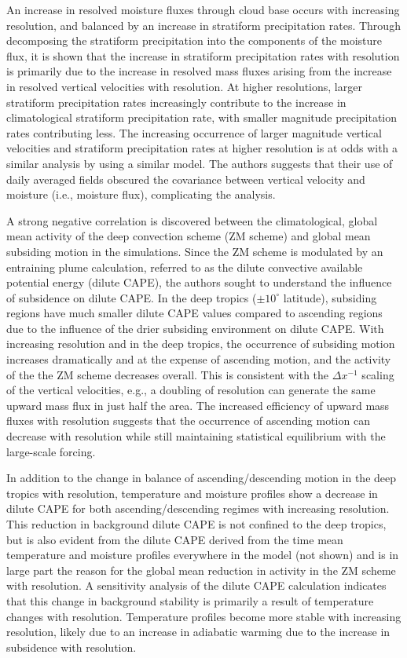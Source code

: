 \documentclass[times]{qjrms4}
\begin{document}
An increase in resolved moisture fluxes through cloud base occurs with increasing resolution, and balanced by an increase in stratiform precipitation rates. Through decomposing the stratiform precipitation into the components of the moisture flux, it is shown that the increase in stratiform precipitation rates with resolution is primarily due to the increase in resolved mass fluxes arising from the increase in resolved vertical velocities with resolution. At higher resolutions, larger stratiform precipitation rates increasingly contribute to the increase in climatological stratiform precipitation rate, with smaller magnitude precipitation rates contributing less. The increasing occurrence of larger magnitude vertical velocities and stratiform precipitation rates at higher resolution is at odds with a similar analysis by \cite{TETAL2018CD} using a similar model. The authors suggests that their use of daily averaged fields obscured the covariance between vertical velocity and moisture (i.e., moisture flux), complicating the analysis.

A strong negative correlation is discovered between the climatological, global mean activity of the \cite{ZM1995AO} deep convection scheme (ZM scheme) and global mean subsiding motion in the simulations. Since the ZM scheme is modulated by an entraining plume calculation, referred to as the dilute convective available potential energy (dilute CAPE), the authors sought to understand the influence of subsidence on dilute CAPE. In the deep tropics ($\pm 10^{\circ}$ latitude), subsiding regions have much smaller dilute CAPE values compared to ascending regions due to the influence of the drier subsiding environment on dilute CAPE. With increasing resolution and in the deep tropics, the occurrence of subsiding motion increases dramatically and at the expense of ascending motion, and the activity of the the ZM scheme decreases overall. This is consistent with the $\Delta x^{-1}$ scaling of the vertical velocities, e.g., a doubling of resolution can generate the same upward mass flux in just half the area. The increased efficiency of upward mass fluxes with resolution suggests that the occurrence of ascending motion can decrease with resolution while still maintaining statistical equilibrium with the large-scale forcing.

In addition to the change in balance of ascending/descending motion in the deep tropics with resolution, temperature and moisture profiles show a decrease in dilute CAPE for both ascending/descending regimes with increasing resolution. This reduction in background dilute CAPE is not confined to the deep tropics, but is also evident from the dilute CAPE derived from the time mean temperature and moisture profiles everywhere in the model (not shown) and is in large part the reason for the global mean reduction in activity in the ZM scheme with resolution. A sensitivity analysis of the dilute CAPE calculation indicates that this change in background stability is primarily a result of temperature changes with resolution. Temperature profiles become more stable with increasing resolution, likely due to an increase in adiabatic warming due to the increase in subsidence with resolution. 
\end{document}
